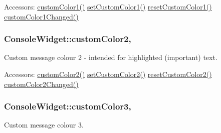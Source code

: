\begin{DoxyParagraph}{Accessors\-:}
\hyperlink{class_console_widget_a18db5e08e8bcd6af5a8f88af6277ada7}{custom\-Color1()} \hyperlink{class_console_widget_a509414a25aabbf38167a8f1d57fea09c}{set\-Custom\-Color1()} \hyperlink{class_console_widget_a2097aef6f449a6d2dd5f653623801f80}{reset\-Custom\-Color1()} \hyperlink{class_console_widget_aa28f784431c1fcb257ca607abf482741}{custom\-Color1\-Changed()} 
\end{DoxyParagraph}
\hypertarget{class_console_widget_a31515e30c85421da91c99274f0904eb6}{
\subsubsection[{custom\-Color2}]{\setlength{\rightskip}{0pt plus 5cm}Console\-Widget\-::custom\-Color2\hspace{0.3cm}{\ttfamily [read]}, {\ttfamily [write]}}}\label{class_console_widget_a31515e30c85421da91c99274f0904eb6}


Custom message colour 2 -\/ intended for highlighted (important) text. 

\begin{DoxyParagraph}{Accessors\-:}
\hyperlink{class_console_widget_a31515e30c85421da91c99274f0904eb6}{custom\-Color2()} \hyperlink{class_console_widget_a14e6815763803393376f4fd1db78821e}{set\-Custom\-Color2()} \hyperlink{class_console_widget_ab3061f5106972084d70bffe9dfffb007}{reset\-Custom\-Color2()} \hyperlink{class_console_widget_abe4b076d1edab52e276659a6ae55bdc5}{custom\-Color2\-Changed()} 
\end{DoxyParagraph}
\hypertarget{class_console_widget_a503ef241a14e2e2990e254bc3e406d66}{
\subsubsection[{custom\-Color3}]{\setlength{\rightskip}{0pt plus 5cm}Console\-Widget\-::custom\-Color3\hspace{0.3cm}{\ttfamily [read]}, {\ttfamily [write]}}}\label{class_console_widget_a503ef241a14e2e2990e254bc3e406d66}


Custom message colour 3. 

